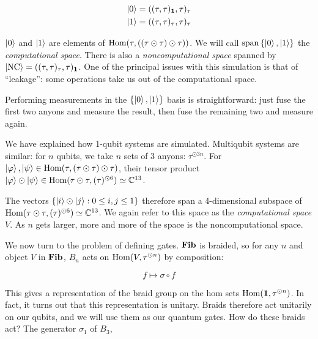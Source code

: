 \begin{align}
\left|0\right> = ((\tau,\tau)_{\mathbf{1}} , \tau)_\tau \\
\left|1\right> = ((\tau,\tau)_\tau , \tau)_\tau 
\end{align}

$\left|0\right>$ and $\left|1\right>$ are elements of $\operatorname{Hom}(\tau, ((\tau \odot \tau)\odot
\tau))$. We will call $\operatorname{span}\left\{ \left|0\right>, \left|1\right> \right\}$
the \emph{computational space}. There is also a \emph{noncomputational space}
spanned by $\left|\text{NC}\right> = ((\tau,\tau)_\tau,
\tau)_{\mathbf{1}}$. One of the principal issues with this simulation is that of
``leakage'': some operations take us out of the computational space. 

Performing measurements in the $\left\{ \left|0\right>, \left|1\right> \right\}$ basis is
straightforward: just fuse the first two anyons and measure the result, then
fuse the remaining two and measure again.

We have explained how 1-qubit systems are simulated. Multiqubit systems are
similar: for $n$ qubits, we take $n$ sets of $3$ anyons: $\tau^{\odot 3n}$.
For $\left|\varphi\right>,\left|\psi\right>\in \operatorname{Hom}(\tau,(\tau \odot \tau) \odot \tau)$,
their tensor product $\left|\varphi\right> \odot \left|\psi\right> \in \operatorname{Hom}(\tau \odot
\tau, (\tau)^{\odot 6}) \simeq \mathbb{C}^{13}$. 

The vectors $\left\{ \left|i\right>\odot \left|j\right> : 0 \leq i,j\leq 1 \right\}$
therefore span a 4-dimensional subspace of $\operatorname{Hom}(\tau \odot \tau, (\tau)^{\odot
6}) \simeq \mathbb{C}^{13}$. We again refer to this space as the
\emph{computational space} $V$. As $n$ gets larger, more and more of the space
is the noncomputational space. 

We now turn to the problem of defining gates. $\mathbf{Fib}$ is braided, so for any $n$
and object $V$ in $\mathbf{Fib}$, $B_n$ acts on $\operatorname{Hom}(V, \tau^{\odot n})$ by
composition: 

\begin{equation}
f \mapsto \sigma \circ f
\end{equation}

This gives a representation of the braid group on the hom sets $\operatorname{Hom}(\mathbf{1},
\tau^{\odot n})$. In fact, it turns out that this representation is unitary.
Braids therefore act unitarily on our qubits, and we will use them as our
quantum gates. How do these braids act? The generator $\sigma_1$ of $B_3$,

